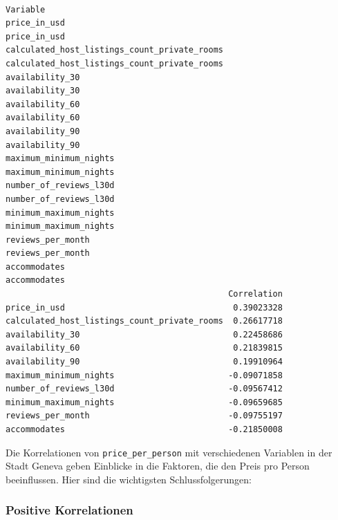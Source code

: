\documentclass[
  journal,
]{IEEEtran}%
\begin{document}
\begin{verbatim}
                                                                                 Variable
price_in_usd                                                                 price_in_usd
calculated_host_listings_count_private_rooms calculated_host_listings_count_private_rooms
availability_30                                                           availability_30
availability_60                                                           availability_60
availability_90                                                           availability_90
maximum_minimum_nights                                             maximum_minimum_nights
number_of_reviews_l30d                                             number_of_reviews_l30d
minimum_maximum_nights                                             minimum_maximum_nights
reviews_per_month                                                       reviews_per_month
accommodates                                                                 accommodates
                                             Correlation
price_in_usd                                  0.39023328
calculated_host_listings_count_private_rooms  0.26617718
availability_30                               0.22458686
availability_60                               0.21839815
availability_90                               0.19910964
maximum_minimum_nights                       -0.09071858
number_of_reviews_l30d                       -0.09567412
minimum_maximum_nights                       -0.09659685
reviews_per_month                            -0.09755197
accommodates                                 -0.21850008
\end{verbatim}

Die Korrelationen von \texttt{price\_per\_person} mit verschiedenen
Variablen in der Stadt Geneva geben Einblicke in die Faktoren, die den
Preis pro Person beeinflussen. Hier sind die wichtigsten
Schlussfolgerungen:

\subsubsection{Positive Korrelationen}\label{positive-korrelationen-2}
\end{document}
